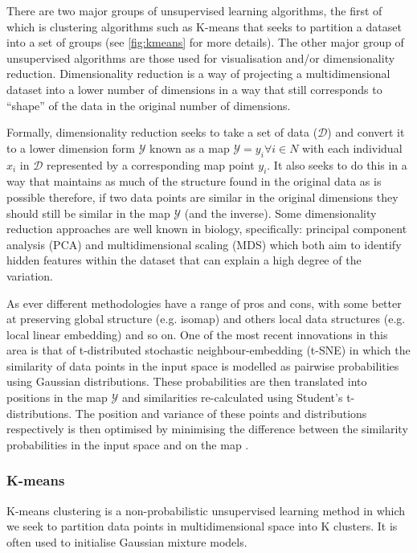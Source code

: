 There are two major groups of unsupervised learning algorithms, the first of which is clustering algorithms
such as K-means that seeks to partition a dataset into a set of groups (see \ref{fig:kmeans} for more details).
The other major group of unsupervised algorithms are those used for visualisation and/or
dimensionality reduction.  Dimensionality reduction is a way of projecting a multidimensional
dataset into a lower number of dimensions in a way that still corresponds to
``shape'' of the data in the original number of dimensions.  

Formally, dimensionality reduction seeks to take a set of data (\(\mathcal{D}\)) and convert it
to a lower dimension form \(\mathcal{Y}\) known as a map \(\mathcal{Y} = {y_{i} \forall i \in N}\) 
with each individual \(x_{i}\) in \(\mathcal{D}\) represented by a corresponding map point \(y_{i}\). It
also seeks to do this in a way that maintains as much of the structure found in the original data 
as is possible \citep{Maaten2008} therefore, if two data points are similar in the original dimensions
they should still be similar in the map \(\mathcal{Y}\) (and the inverse).
Some dimensionality reduction approaches are well known in biology, specifically: principal component analysis (PCA) 
\citep{hotelling1933analysis} and multidimensional scaling (MDS) \citep{Torgerson1952} which both aim to identify
hidden features within the dataset that can explain a high degree of the variation.  


As ever different methodologies have a range of pros and cons, with
some better at preserving global structure (e.g. isomap) and others local data structures (e.g. local linear embedding) and so on.
One of the most recent innovations in this area is that of t-distributed stochastic neighbour-embedding
(t-SNE) in which the similarity of data points in the input space is modelled as pairwise probabilities 
using Gaussian distributions.
These probabilities are then translated into positions in the map \(\mathcal{Y}\) and similarities re-calculated
using Student's t-distributions.  The position and variance of these points and distributions respectively
is then optimised by minimising the difference between the similarity probabilities in the input space
and on the map \citep{Maaten2008}.

\subsubsection{K-means}

K-means clustering is a non-probabilistic unsupervised learning 
method in which we seek to partition data points in multidimensional space into 
K clusters. It is often used to initialise Gaussian mixture models.

